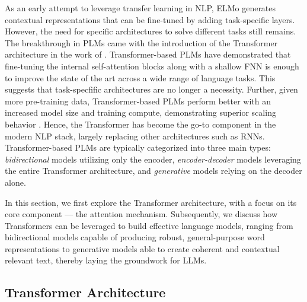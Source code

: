 As an early attempt to leverage transfer learning in \ac{NLP}, \ac{ELMo} generates contextual representations that can be fine-tuned by adding task-specific layers. However, the need for specific architectures to solve different tasks still remains. The breakthrough in \acp{PLM} came with the introduction of the Transformer architecture in the work of \citet{vaswani2017attention}. Transformer-based \acp{PLM} \citep{devlin2018bert, radford2018improving} have demonstrated that fine-tuning the internal self-attention blocks along with a shallow \ac{FNN} is enough to improve the state of the art across a wide range of language tasks. This suggests that task-specfific architectures are no longer a necessity. Further, given more pre-training data, Transformer-based \acp{PLM} perform better with an increased model size and training compute, demonstrating superior scaling behavior \citep{kaplan2020scaling}. Hence, the Transformer has become the go-to component in the modern \ac{NLP} stack, largely replacing other architectures such as \acp{RNN}. Transformer-based \acp{PLM} are typically categorized into three main types: \textit{bidirectional} models utilizing only the encoder, \textit{encoder-decoder} models leveraging the entire Transformer architecture, and \textit{generative} models relying on the decoder alone.

In this section, we first explore the Transformer architecture, with a focus on its core component — the attention mechanism. Subsequently, we discuss how Transformers can be leveraged to build effective language models, ranging from bidirectional models capable of producing robust, general-purpose word representations to generative models able to create coherent and contextual relevant text, thereby laying the groundwork for \acp{LLM}.




\subsection{Transformer Architecture}

